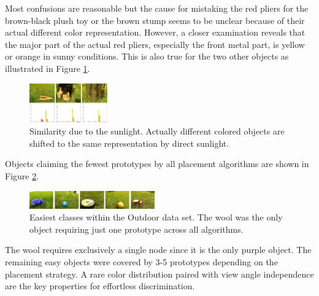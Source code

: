 \documentclass[conference]{IEEEtran}
\begin{document}
Most confusions are reasonable but the cause for mistaking the red pliers for the brown-black plush toy or the brown stump seems to be unclear 
because of their actual different color representation. 
However, a closer examination reveals that the major part of the actual red pliers, 
especially the front metal part, is yellow or orange in sunny conditions. This is also true for the two other objects as illustrated in Figure \ref{fig:ConfusionsOutdoor}.\\
\begin{figure}
        \centering
        \includegraphics[width=0.3\textwidth]{Images/Outdoor/Confusions.jpg}
        \caption{Similarity due to the sunlight. Actually different colored objects are shifted to the same representation by direct sunlight.}
        \label{fig:ConfusionsOutdoor}        
\end{figure}
Objects claiming the fewest prototypes by all placement algorithms are shown in Figure \ref{fig:OutdoorEasy}. 
\begin{figure}
        \centering
        \includegraphics[width=0.48\textwidth]{Images/Outdoor/Easy.jpg}
        \caption{Easiest classes within the Outdoor data set. The wool was the only object requiring just one prototype across all algorithms. }
        \label{fig:OutdoorEasy}
\end{figure}
The wool requires exclusively a single node since it is the only purple object. The remaining easy objects were covered by 3-5 prototypes
depending on the placement strategy. A rare color distribution paired 
with view angle independence are the key properties for effortless discrimination.
\end{document}
